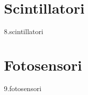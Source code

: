 \documentclass[12pt]{book}
\newcommand{\comment}[1]{}
\begin{document}
\chapter{Scintillatori}
{8.scintillatori}


\chapter{Fotosensori}
{9.fotosensori}

\comment{%

\chapter{Rivelatori a semiconduttore}
{10.rivelatori_a_semiconduttori}

\chapter{La tecnologia del vuoto}
{11.tecnologie_vuoto}

\chapter{Elettronica}\label{chap:elettronica}
{12.elettronica}

\chapter{Metodo Monte Carlo}
{13.montecarlo}

\chapter{Esperienze di laboratorio}
{14.esperienze}

\appendix

\chapter{Distribuzione di Poisson}
{A.distribuzione_Poisson}

\chapter{Multimetro digitale}
{B.multimetro}

}%
\end{document}
